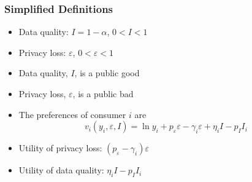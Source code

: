 \begin{frame}[allowframebreaks]%
\frametitle{Simplified Definitions}
\begin{itemize}
	\item Data quality: $I=1-\alpha$, $0<I<1$ \vspace*{.25in}
	\item Privacy loss: $\varepsilon$, $0<\varepsilon<1$ \vspace*{.25in}
	\item Data quality, $I$, is a public good \vspace*{.25in}
	\item Privacy loss, $\varepsilon$, is a public bad \vspace*{.25in}
	\item The preferences of consumer $i$ are
		\begin{equation}
		v_{i}\left( y_{i},\varepsilon,I \right) =\ln y_{i}+p_{\varepsilon
		}\varepsilon -\gamma _{i}\varepsilon +\eta _{i}I-p_II_{i}  %
		\end{equation}%
	\item Utility of privacy loss: $\left(p_{\varepsilon}-\gamma_{i}\right)\varepsilon$
	\item Utility of data quality: $\eta_{i}I-p_II_{i}$ \vspace*{.25in}
\end{itemize}


\end{frame}%
%

